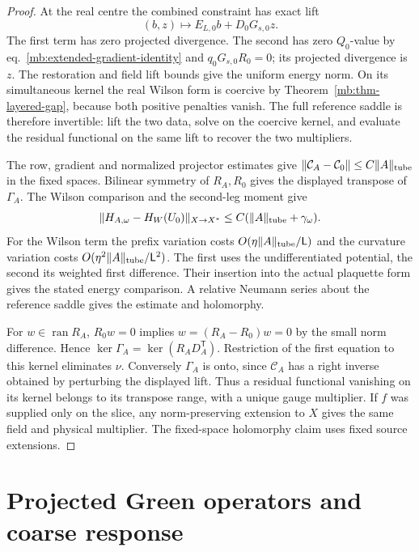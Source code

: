 \documentclass[11pt,letterpaper,reqno]{amsart}
\numberwithin{equation}{section}
\renewcommand{\eqref}[1]{\textup{eq.~\ref{#1}}}
\theoremstyle{definition}
\theoremstyle{remark}
\begin{document}
\begin{proof}
At the real centre the combined constraint has exact lift
\[
        (b,z)\longmapsto E_{L,0}b+D_0G_{s,0}z .
\]
The first term has zero projected divergence. The second
has zero \(Q_0\)-value by \eqref{mb:extended-gradient-identity}
and \(q_0G_{s,0}R_0=0\); its projected divergence is \(z\).
The restoration and field lift bounds give the uniform
energy norm. On its simultaneous kernel the real Wilson
form is coercive by Theorem~\ref{mb:thm-layered-gap},
because both positive penalties vanish. The full reference
saddle is therefore invertible: lift the two data, solve
on the coercive kernel, and evaluate the residual
functional on the same lift to recover the two multipliers.

The row, gradient and normalized projector estimates
give \(\|\mathcal C_A-\mathcal C_0\|\le C\|A\|_{\rm tube}\)
in the fixed spaces. Bilinear symmetry of \(R_A,R_0\)
gives the displayed transpose of \(\Gamma_A\).
The Wilson comparison and the second-leg moment give
\[
 \|H_{A,\omega}-H_W(U_0)\|_{X\to X^*}
       \le C(\|A\|_{\rm tube}+\gamma_\omega).
\]
For the Wilson term the prefix variation costs
\(O(\eta\|A\|_{\rm tube}/\mathsf L)\) and the curvature
variation costs \(O(\eta^2\|A\|_{\rm tube}/\mathsf L^2)\).
The first uses the undifferentiated potential, the second
its weighted first difference. Their insertion into the
actual plaquette form gives the stated energy comparison.
A relative Neumann series about the reference saddle
gives the estimate and holomorphy.

For \(w\in\operatorname{ran}R_A\), \(R_0w=0\) implies
\(w=(R_A-R_0)w=0\) by the small norm difference.
Hence \(\ker\Gamma_A=\ker(R_A D_A^{\mathsf T})\).
Restriction of the first equation to this kernel
eliminates \(\nu\). Conversely \(\Gamma_A\) is onto,
since \(\mathcal C_A\) has a right inverse obtained by
perturbing the displayed lift. Thus a residual functional
vanishing on its kernel belongs to its transpose range,
with a unique gauge multiplier. If \(f\) was supplied only
on the slice, any norm-preserving extension to \(X\) gives
the same field and physical multiplier. The fixed-space
holomorphy claim uses fixed source extensions.
\end{proof}


\section{Projected Green operators and coarse response}
\label{mb:sec-reconstruction}
\end{document}
